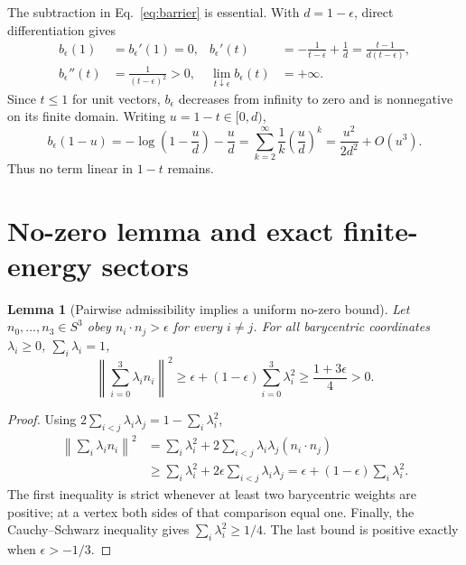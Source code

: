 \documentclass[11pt]{article}
\numberwithin{equation}{section}
\newtheorem{lemma}[theorem]{Lemma}
\theoremstyle{definition}
\theoremstyle{remark}
\begin{document}
The subtraction in Eq.~\eqref{eq:barrier} is essential.  With
\(d=1-\epsilon\), direct differentiation gives
\begin{align}
 b_\epsilon(1)&=b_\epsilon'(1)=0,
 &b_\epsilon'(t)&=-\frac1{t-\epsilon}+\frac1d
 =\frac{t-1}{d(t-\epsilon)},\label{eq:bprime}\\
 b_\epsilon''(t)&=\frac1{(t-\epsilon)^2}>0,
 &\lim_{t\downarrow\epsilon}b_\epsilon(t)&=+\infty.
 \label{eq:bsecond}
\end{align}
Since \(t\le1\) for unit vectors, \(b_\epsilon\) decreases from infinity to
zero and is nonnegative on its finite domain.  Writing
\(u=1-t\in[0,d)\),
\begin{equation}
 b_\epsilon(1-u)
 =-\log\left(1-\frac ud\right)-\frac ud
 =\sum_{k=2}^{\infty}\frac1k\left(\frac ud\right)^k
 =\frac{u^2}{2d^2}+O(u^3).
 \label{eq:barrier-series}
\end{equation}
Thus no term linear in \(1-t\) remains.

\section{No-zero lemma and exact finite-energy sectors}

\begin{lemma}[Pairwise admissibility implies a uniform no-zero bound]
Let \(n_0,\ldots,n_3\in S^3\) obey
\(n_i\cdot n_j>\epsilon\) for every \(i\ne j\).  For all barycentric
coordinates \(\lambda_i\ge0\), \(\sum_i\lambda_i=1\),
\begin{equation}
 \left\lVert\sum_{i=0}^3\lambda_i n_i\right\rVert^2
 \ge \epsilon+(1-\epsilon)\sum_{i=0}^3\lambda_i^2
 \ge\frac{1+3\epsilon}{4}>0.
 \label{eq:no-zero-bound}
\end{equation}
\end{lemma}

\begin{proof}
Using \(2\sum_{i<j}\lambda_i\lambda_j
=1-\sum_i\lambda_i^2\),
\begin{align}
 \left\lVert\sum_i\lambda_i n_i\right\rVert^2
 &=\sum_i\lambda_i^2
 +2\sum_{i<j}\lambda_i\lambda_j(n_i\cdot n_j)\nonumber\\
 &\ge\sum_i\lambda_i^2
 +2\epsilon\sum_{i<j}\lambda_i\lambda_j
 =\epsilon+(1-\epsilon)\sum_i\lambda_i^2.
\end{align}
The first inequality is strict whenever at least two barycentric weights are
positive; at a vertex both sides of that comparison equal one.  Finally,
the Cauchy--Schwarz inequality gives \(\sum_i\lambda_i^2\ge1/4\).
The last bound is positive exactly when \(\epsilon>-1/3\).
\end{proof}
\end{document}
